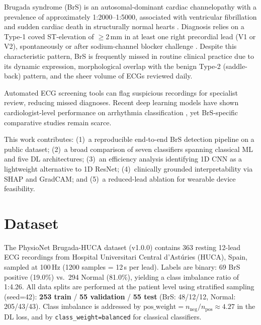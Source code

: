 \documentclass[journal, 10pt, twoside]{IEEEtran}
\begin{document}
Brugada syndrome (BrS) is an autosomal-dominant cardiac channelopathy
with a prevalence of approximately 1:2000--1:5000, associated with
ventricular fibrillation and sudden cardiac death in structurally normal
hearts \cite{brugada1992right, antzelevitch2005brugada}.
Diagnosis relies on a Type-1 coved ST-elevation of $\geq$2\,mm in at
least one right precordial lead (V1 or V2), spontaneously or after
sodium-channel blocker challenge \cite{priori2013hrs}.
Despite this characteristic pattern, BrS is frequently missed in routine
clinical practice due to its dynamic expression, morphological overlap
with the benign Type-2 (saddle-back) pattern, and the sheer volume
of ECGs reviewed daily.

Automated ECG screening tools can flag suspicious recordings for specialist
review, reducing missed diagnoses.
Recent deep learning models have shown cardiologist-level performance on
arrhythmia classification \cite{hannun2019cardiologist, ribeiro2020automatic},
yet BrS-specific comparative studies remain scarce.

This work contributes: (1)~a reproducible end-to-end BrS detection
pipeline on a public dataset; (2)~a broad comparison of seven classifiers
spanning classical ML and five DL architectures; (3)~an efficiency
analysis identifying 1D CNN as a lightweight alternative to 1D ResNet;
(4)~clinically grounded interpretability via SHAP and GradCAM;
and (5)~a reduced-lead ablation for wearable device feasibility.

\section{Dataset}
\label{sec:dataset}

The PhysioNet Brugada-HUCA dataset \cite{dataset, physionet} (v1.0.0)
contains 363 resting 12-lead ECG recordings from Hospital Universitari
Central d'Astúries (HUCA), Spain, sampled at 100\,Hz (1200 samples
= 12\,s per lead).
Labels are binary: 69 BrS positive (19.0\%) vs.\ 294 Normal (81.0\%),
yielding a class imbalance ratio of 1:4.26.
All data splits are performed at the patient level using stratified
sampling (seed=42): \textbf{253 train} / \textbf{55 validation} /
\textbf{55 test} (BrS: 48/12/12, Normal: 205/43/43).
Class imbalance is addressed by $\text{pos\_weight}
= n_\text{neg}/n_\text{pos} \approx 4.27$ in the DL loss, and by
\texttt{class\_weight=balanced} for classical classifiers.
\end{document}

